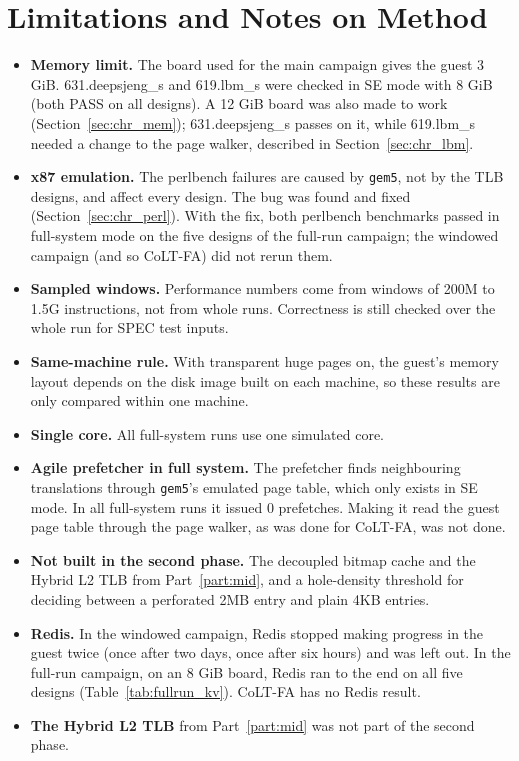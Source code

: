 \section{Limitations and Notes on Method}
\label{sec:limits}
\begin{itemize}
    \item \textbf{Memory limit.} The board used for the main campaign gives the guest 3 GiB. 631.deepsjeng\_s and 619.lbm\_s were checked in SE mode with 8 GiB (both PASS on all designs). A 12 GiB board was also made to work (Section~\ref{sec:chr_mem}); 631.deepsjeng\_s passes on it, while 619.lbm\_s needed a change to the page walker, described in Section~\ref{sec:chr_lbm}.
    \item \textbf{x87 emulation.} The perlbench failures are caused by \texttt{gem5}, not by the TLB designs, and affect every design. The bug was found and fixed (Section~\ref{sec:chr_perl}). With the fix, both perlbench benchmarks passed in full-system mode on the five designs of the full-run campaign; the windowed campaign (and so CoLT-FA) did not rerun them.
    \item \textbf{Sampled windows.} Performance numbers come from windows of 200M to 1.5G instructions, not from whole runs. Correctness is still checked over the whole run for SPEC test inputs.
    \item \textbf{Same-machine rule.} With transparent huge pages on, the guest's memory layout depends on the disk image built on each machine, so these results are only compared within one machine.
    \item \textbf{Single core.} All full-system runs use one simulated core.
    \item \textbf{Agile prefetcher in full system.} The prefetcher finds neighbouring translations through \texttt{gem5}'s emulated page table, which only exists in SE mode. In all full-system runs it issued 0 prefetches. Making it read the guest page table through the page walker, as was done for CoLT-FA, was not done.
    \item \textbf{Not built in the second phase.} The decoupled bitmap cache and the Hybrid L2 TLB from Part~\ref{part:mid}, and a hole-density threshold for deciding between a perforated 2MB entry and plain 4KB entries.
    \item \textbf{Redis.} In the windowed campaign, Redis stopped making progress in the guest twice (once after two days, once after six hours) and was left out. In the full-run campaign, on an 8 GiB board, Redis ran to the end on all five designs (Table~\ref{tab:fullrun_kv}). CoLT-FA has no Redis result.
    \item \textbf{The Hybrid L2 TLB} from Part~\ref{part:mid} was not part of the second phase.
\end{itemize}

